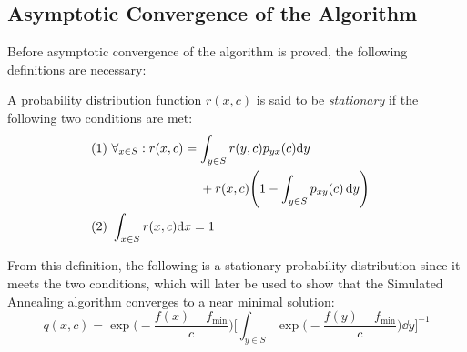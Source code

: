 \subsection{Asymptotic Convergence of the Algorithm}

Before asymptotic convergence of the algorithm is proved, the following definitions are necessary:

\begin{definition}
A probability distribution function $r(x,c)$ is said to be \textit{stationary} if the following two conditions are met:
\begin{align}
    (1)\, & \, \forall_{x \in S}:r(x,c)=\int_{y \in S} r(y,c)p_{yx}(c) \dd y &  \notag \\
    & \hspace{25mm} + r(x,c) \Bigg( 1-\int_{y \in S} p_{xy}(c) \, \dd y \Bigg) &  \\
    (2) \,& \, \int_{x \in S} r(x,c) \dd x =1
\end{align}
\end{definition}

From this definition, the following is a stationary probability distribution since it meets the two conditions, which will later be used to show that the Simulated Annealing algorithm converges to a near minimal solution:
\begin{equation}
    q(x,c)=\exp{\Bigg( -\dfrac{f(x)-f_{\min}}{c} \Bigg)} \Bigg[ \int_{y \in S} \exp{\Bigg( -\dfrac{f(y)-f_{\min}}{c} \Bigg)}  \dd y \Bigg]^{-1}
    \label{eq:qxc}
\end{equation}


